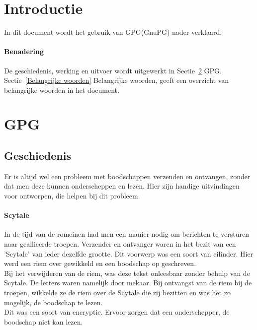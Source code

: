 \documentclass[12pt]{article}
\begin{document}
	\maketitle

	\newpage
	\tableofcontents
	\newpage
	\listoffigures
	\listoftables

	\newpage
		\section{Introductie}
			In dit document wordt het gebruik van GPG(GnuPG) nader verklaard.

		\paragraph{Benadering}
			De geschiedenis, werking en uitvoer wordt uitgewerkt in Sectie~\ref{GPG} GPG.\\
			Sectie~\ref{Belangrijke woorden} Belangrijke woorden, geeft een overzicht van belangrijke 			woorden in het document.

		\newpage
		\section{GPG}\label{GPG}
			\subsection{Geschiedenis}
				Er is altijd wel een probleem met boodschappen verzenden en ontvangen, zonder dat men 				deze kunnen onderscheppen en lezen. Hier zijn handige uitvindingen voor ontworpen, 						die helpen bij dit probleem.

			\paragraph{Scytale}
				In de tijd van de romeinen had men een manier nodig om berichten te versturen naar 						geallieerde troepen. Verzender en ontvanger waren in het bezit van een 'Scytale' van 					ieder dezelfde grootte. Dit voorwerp was een soort van cilinder. Hier werd een riem 					over gewikkeld en een boodschap op geschreven.\\
				Bij het verwijderen van de riem, was deze tekst onleesbaar zonder behulp van de 						Scytale. De letters waren namelijk door mekaar. Bij ontvangst van de riem bij de 						troepen, wikkelde ze de riem over de Scytale die zij bezitten en was het zo mogelijk, 				de boodschap te lezen.\\
				Dit was een soort van encryptie. Ervoor zorgen dat een onderschepper, de boodschap 						niet kan lezen.
\end{document}
